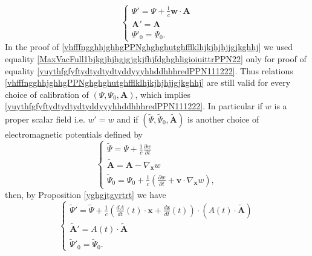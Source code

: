 \documentclass{article}
\theoremstyle{definition}
\theoremstyle{remark}
\renewcommand{\vec}[1]{\mathbf{#1}}
\newcommand{\er}{\eqref}
\newcommand{\er}{\eqref}
\begin{document}
%
%
%
\begin{equation}\label{vhfffngghhjghhgPPNghghghutghfflklhjkjhjhjjgjkghhjhhhjhgjgu}
\begin{cases}
\Psi'=
\Psi+\frac{1}{c}\vec w\cdot\vec A
\\
\vec A'=\vec A\\
\Psi'_0=\Psi_0.
\end{cases}
\end{equation}
In the proof of
\er{vhfffngghhjghhgPPNghghghutghfflklhjkjhjhjjgjkghhj} we used
equality \er{MaxVacFull1bjkgjhjhgjgjgkjfhjfdghghligioiuittrPPN22}
only for proof of equality
\er{yuythfgfyftydtydtydtyddyyyhhddhhhredPPN111222}. Thus relations
\er{vhfffngghhjghhgPPNghghghutghfflklhjkjhjhjjgjkghhj} are still
valid for every choice of calibration of $(\Psi,\Psi_0,\vec A)$,
which implies \er{yuythfgfyftydtydtydtyddyyyhhddhhhredPPN111222}. In
particular if $w$ is a proper scalar field i.e. $w'=w$ and if
$(\tilde\Psi,\tilde\Psi_0,\tilde{\vec A})$ is another choice of
electromagnetic potentials defined by
\begin{equation}\label{MaxVacFull1bjkgjhjhgjgjgkjfhjfdghghligioiuittrPPNhjkjhkjgghhjjhjkjggh}
\begin{cases}
\tilde\Psi=\Psi+\frac{1}{c}\frac{\partial w}{\partial t}\\
\tilde{\vec A}=\vec A-\nabla_{\vec x}w\\
\tilde\Psi_0=\Psi_0+\frac{1}{c}\left(\frac{\partial w}{\partial
t}+\vec v\cdot\nabla_{\vec x}w\right),
\end{cases}
\end{equation}
then, by Proposition \ref{yghgjtgyrtrt}
we have
\begin{equation}\label{vhfffngghhjghhgPPNghghghutghfflklhjkjhjhjjgjkghhjhjkhjg}
\begin{cases}
\tilde\Psi'= \tilde\Psi+\frac{1}{c}\left(\frac{dA}{dt}(t)\cdot\vec
x+\frac{d\vec z}{dt}(t)\right)\cdot\left(A(t)\cdot\tilde{\vec
A}\right)
\\
\tilde{\vec A}'=A(t)\cdot \tilde{\vec A}\\
\tilde\Psi'_0=\tilde\Psi_0.
\end{cases}
\end{equation}
\end{document}
